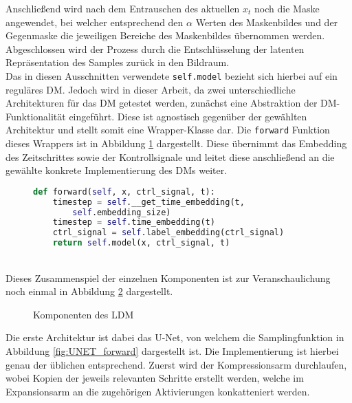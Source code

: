 Anschließend wird nach dem Entrauschen des aktuellen $x_t$ noch die Maske angewendet, bei welcher entsprechend den $\alpha$ Werten des Maskenbildes und der Gegenmaske die jeweiligen Bereiche des Maskenbildes übernommen werden. \\
Abgeschlossen wird der Prozess durch die Entschlüsselung der latenten Repräsentation des Samples zurück in den Bildraum. \\
Das in diesen Ausschnitten verwendete \texttt{self.model} bezieht sich hierbei auf ein reguläres \ac{DM}. Jedoch wird in dieser Arbeit, da zwei unterschiedliche Architekturen für das DM getestet werden, zunächst eine Abstraktion der DM-Funktionalität eingeführt. Diese ist agnostisch gegenüber der gewählten Architektur und stellt somit eine Wrapper-Klasse dar. Die \texttt{forward} Funktion dieses Wrappers ist in Abbildung \ref{fig:DM_forward} dargestellt. Diese übernimmt das Embedding des Zeitschrittes sowie der Kontrollsignale und leitet diese anschließend an die gewählte konkrete Implementierung des \ac{DM}s weiter. 
\begin{figure}[htbp]
\begin{lstlisting}[language=python]
def forward(self, x, ctrl_signal, t):
    timestep = self.__get_time_embedding(t, 
        self.embedding_size)
    timestep = self.time_embedding(t)
    ctrl_signal = self.label_embedding(ctrl_signal)
    return self.model(x, ctrl_signal, t)
\end{lstlisting}
    \captionsetup{type=figure}
    \label{fig:DM_forward}
\end{figure} \\
Dieses Zusammenspiel der einzelnen Komponenten ist zur Veranschaulichung noch einmal in Abbildung \ref{fig:LDM_arch} dargestellt.
\begin{figure}[htbp]
    \centering
    \caption{Komponenten des \ac{LDM}}
    \label{fig:LDM_arch}
\end{figure}
Die erste Architektur ist dabei das U-Net, von welchem die Samplingfunktion in Abbildung \ref{fig:UNET_forward} dargestellt ist. Die Implementierung ist hierbei genau der üblichen entsprechend. Zuerst wird der Kompressionsarm durchlaufen, wobei Kopien der jeweils relevanten Schritte erstellt werden, welche im Expansionsarm an die zugehörigen Aktivierungen konkatteniert werden.  
